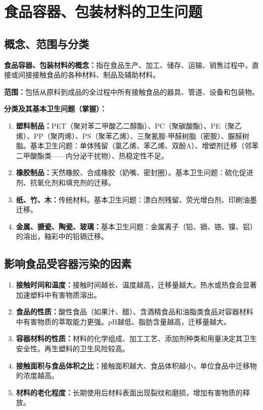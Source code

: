 \section{食品容器、包装材料的卫生问题}

\subsection{概念、范围与分类}

\begin{keybox}
\textbf{食品容器、包装材料的概念：}指在食品生产、加工、储存、运输、销售过程中，直接或间接接触食品的各种材料、制品及辅助材料。

\textbf{范围：}包括从原料到成品的全过程中所有接触食品的器具、管道、设备和包装物。

\textbf{分类及其基本卫生问题（掌握）：}
\begin{enumerate}[leftmargin=*]
    \item \textbf{塑料制品：}PET（聚对苯二甲酸乙二醇酯）、PC（聚碳酸酯）、PE（聚乙烯）、PP（聚丙烯）、PS（聚苯乙烯）、三聚氰胺-甲醛树脂（密胺）、脲醛树脂。基本卫生问题：单体残留（氯乙烯、苯乙烯、双酚A）、增塑剂迁移（邻苯二甲酸酯类——内分泌干扰物）、热稳定性不足。
    \item \textbf{橡胶制品：}天然橡胶、合成橡胶（奶嘴、密封圈）。基本卫生问题：硫化促进剂、抗氧化剂和填充剂的迁移。
    \item \textbf{纸、竹、木：}传统材料。基本卫生问题：漂白剂残留、荧光增白剂、印刷油墨迁移。
    \item \textbf{金属、搪瓷、陶瓷、玻璃：}基本卫生问题：金属离子（铅、镉、铬、镍、铝）的溶出，釉彩中的铅镉迁移。
\end{enumerate}
\end{keybox}

\subsection{影响食品受容器污染的因素}

\begin{defbox}
\begin{enumerate}[leftmargin=*]
    \item \textbf{接触时间和温度：}接触时间越长、温度越高，迁移量越大。热水或热食会显著加速塑料中有害物质溶出。
    \item \textbf{食品的性质：}酸性食品（如果汁、醋）、含酒精食品和油脂类食品对容器材料中有害物质的萃取能力更强。pH越低、脂肪含量越高，迁移量越大。
    \item \textbf{容器材料的性质：}材料的化学组成、加工工艺、添加剂种类和用量决定其卫生安全性。再生塑料的卫生风险较高。
    \item \textbf{接触面积与食品体积之比：}接触面积越大、食品体积越小，单位食品中迁移物的浓度越高。
    \item \textbf{材料的老化程度：}长期使用后材料表面出现裂纹和磨损，增加有害物质的释放。
\end{enumerate}
\end{defbox}

